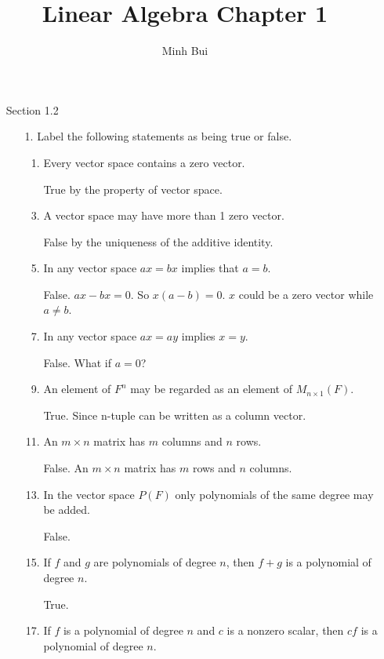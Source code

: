 \documentclass{article}
\author{Minh Bui}
\title{Linear Algebra Chapter 1}
\theoremstyle{claim}
\theoremstyle{definition}
\begin{document}
\maketitle
\begin{enumerate}
    \item[Section 1.2]
        \begin{enumerate}
            \item[1.] Label the following statements as being true or false.
                \begin{enumerate}
                    \item Every vector space contains a zero vector. 
                    \item[] True by the property of vector space.
                    \item A vector space may have more than 1 zero vector.
                    \item[] False by the uniqueness of the additive identity.
                    \item In any vector space $ax = bx$ implies that $a = b$.
                    \item[] False. $ax - bx = 0$. So $x(a - b) = 0$. $x$ could be a zero vector while $a \ne b$.
                    \item In any vector space $ax = ay$ implies $x = y$.
                    \item[] False. What if $a = 0$?
                    \item An element of $F^n$ may be regarded as an element of $M_{n \times 1}(F)$.
                    \item[] True. Since n-tuple can be written as a column vector.
                    \item An $m \times n$ matrix has $m$ columns and $n$ rows.
                    \item[] False. An $m \times n$ matrix has $m$ rows and $n$ columns.
                    \item In the vector space $P(F)$ only polynomials of the same degree may be added.
                    \item[] False.
                    \item If $f$ and $g$ are polynomials of degree $n$, then $f + g$ is a polynomial of degree $n$.
                    \item[] True.
                    \item If $f$ is a polynomial of degree $n$ and $c$ is a nonzero scalar, then $cf$ is a polynomial of degree $n$.

\end{enumerate}
\end{enumerate}
\end{enumerate}
\end{document}
